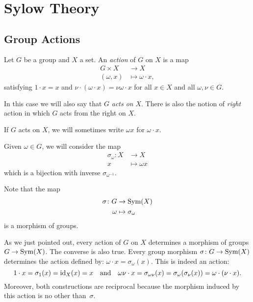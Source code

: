 \chapter{Sylow Theory}
\section{Group Actions}
\begin{defn}
    Let\/ $G$ be a group and $X$ a set. An \textsl{action} of\/ $G$ on $X$ is a map
    \begin{align*}
        G\times X&\to X\\
        (\omega,x)&\mapsto \omega\cdot x,
    \end{align*}
    satisfying $1\cdot x=x$ and\/ $\nu\cdot(\omega\cdot x)=\nu\omega\cdot x$ for all\/ $x\in X$ and all\/ $\omega,\nu\in G$.

    In this case we will also say that\/ $G$ \textsl{acts on\/} $X$. There is also the notion of \textsl{right} action in which\/ $G$ acts from the right on $X$.
\end{defn}

\begin{ntn}
    If\/ $G$ acts on $X$, we will sometimes write $\omega x$ for $\omega\cdot x$.
    
    Given $\omega\in G$, we will consider the map
    \begin{align*}
        \sigma_\omega\colon X&\to X\\
        x&\mapsto \omega x
    \end{align*}
    which is a bijection with inverse $\sigma_{\omega^{-1}}$.
    
    Note that the map
    \begin{align*}
        \sigma\colon G&\to{\rm Sym}(X)\\
        \omega&\mapsto \sigma_\omega
    \end{align*}
    is a morphism of groups.
\end{ntn}

\begin{rem}\label{actions-are-group-morphisms}
    As we just pointed out, every action of\/ $G$ on\/ $X$ determines a morphism of groups\/ $G\to{\rm Sym}(X)$. The converse is also true. Every group morphism\/ $\sigma\colon G\to{\rm Sym}(X)$ determines the action defined by: $\omega\cdot x=\sigma_\omega(x)$. This is indeed an action:
    $$
        1\cdot x=\sigma_1(x)=\operatorname{id}_X(x)=x\quad\text{\rm and}\quad
        \omega\nu\cdot x=\sigma_{\omega\nu}(x)=\sigma_\omega(\sigma_\nu(x))=\omega\cdot(\nu\cdot x).
    $$
    Moreover, both constructions are reciprocal because the morphism induced by this action is no other than\/~$\sigma$.
\end{rem}

